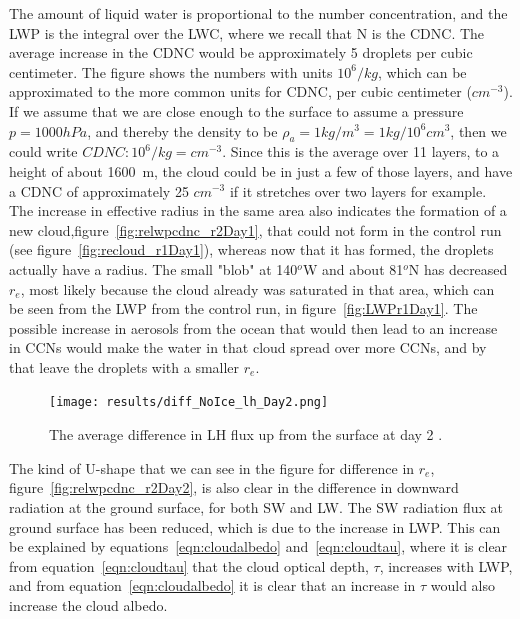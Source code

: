 The amount of liquid water is proportional to the number concentration, and the LWP is the integral over the LWC, where we recall that N is the CDNC. The average increase in the CDNC would be approximately 5 droplets per cubic centimeter. The figure shows the numbers with units $10^6/kg$, which can be approximated to the more common units for CDNC, per cubic centimeter ($cm^{-3}$). If we assume that we are close enough to the surface to assume a pressure $p=1000hPa$, and thereby the density to be $\rho_a = 1kg/m^3=1kg/10^6cm^3$, then we could write $CDNC : 10^6/kg = cm^{-3}$. Since this is the average over 11 layers, to a height of about 1600~m, the cloud could be in just a few of those layers, and have a CDNC of approximately 25 $cm^{-3}$ if it stretches over two layers for example. The increase in effective radius in the same area also indicates the formation of a new cloud,figure~\ref{fig:relwpcdnc_r2Day1}, that could not form in the control run (see figure~\ref{fig:recloud_r1Day1}), whereas now that it has formed, the droplets actually have a radius. The small "blob" at 140$^o$W and about 81$^o$N has decreased $r_e$, most likely because the cloud already was saturated in that area, which can be seen from the LWP from the control run, in figure~\ref{fig:LWPr1Day1}. The possible increase in aerosols from the ocean that would then lead to an increase in CCNs would make the water in that cloud spread over more CCNs, and by that leave the droplets with a smaller $r_e$.

\begin{figure}
\centering
\texttt{[image: results/diff\_NoIce\_lh\_Day2.png]}
\caption{The average difference in LH flux up from the surface at day 2 .}
\label{fig:lhdiff_r2Day2}
\end{figure}

The kind of U-shape that we can see in the figure for difference in $r_e$, figure~\ref{fig:relwpcdnc_r2Day2}, is also clear in the difference in downward radiation at the ground surface, for both SW and LW. The SW radiation flux at ground surface has been reduced, which is due to the increase in LWP. This can be explained by equations~\ref{eqn:cloudalbedo} and~\ref{eqn:cloudtau}, where it is clear from equation~\ref{eqn:cloudtau} that the cloud optical depth, $\tau$, increases with LWP, and from equation~\ref{eqn:cloudalbedo} it is clear that an increase in $\tau$ would also increase the cloud albedo.

